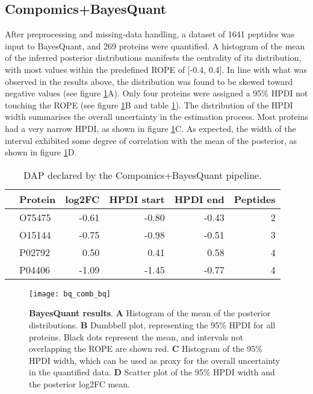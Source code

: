 \subsection{Compomics+BayesQuant}

After preprocessing and missing-data handling, a dataset of 1641 peptides was input to BayesQuant, and 269 proteins were quantified. A histogram of the mean of the inferred posterior distributions manifests the centrality of its distribution, with most values within the predefined \ac{ROPE} of [-0.4, 0.4]. In line with what was observed in the results above, the distribution was found to be skewed toward negative values (see figure \ref{fig:compomics_bq}A). Only four proteins were assigned a 95\% \ac{HPDI} not touching the \ac{ROPE} (see figure \ref{fig:compomics_bq}B and table \ref{tab:thp1_bq_results}). The distribution of the \ac{HPDI} width summarises the overall uncertainty in the estimation process. Most proteins had a very narrow HPDI, as shown in figure \ref{fig:compomics_bq}C. As expected, the width of the interval exhibited some degree of correlation with the mean of the posterior, as shown in figure \ref{fig:compomics_bq}D.

\begin{table}[!h]
\centering
\begin{tabular}{rlrrrr}
  \hline
 & Protein & log2FC & HPDI start & HPDI end & Peptides \\ 
  \hline
& O75475 & -0.61 & -0.80 & -0.43 & 2 \\ 
   & O15144 & -0.75 & -0.98 & -0.51 & 3 \\ 
   & P02792 & 0.50 & 0.41 & 0.58 & 4 \\ 
   & P04406 & -1.09 & -1.45 & -0.77 & 4 \\ 
   \hline
\end{tabular}
\caption{\ac{DAP} declared by the Compomics+BayesQuant pipeline.}
\label{tab:thp1_bq_results}
\end{table}


\begin{figure}[H]
\centering
\texttt{[image: bq\_comb\_bq]}
\caption[Compomics+BayesQuant results on the THP-1 dataset]{\textbf{BayesQuant results}. \textbf{A} Histogram of the mean of the posterior distributions. \textbf{B} Dumbbell plot, representing the 95\% \ac{HPDI} for all proteins. Black dots represent the mean, and intervals not overlapping the \ac{ROPE} are shown red. \textbf{C} Histogram of the 95\% \ac{HPDI} width, which can be used as proxy for the overall uncertainty in the quantified data. \textbf{D} Scatter plot of the 95\% \ac{HPDI} width and the  posterior \ac{log2FC} mean.}
\label{fig:compomics_bq}
\end{figure}


